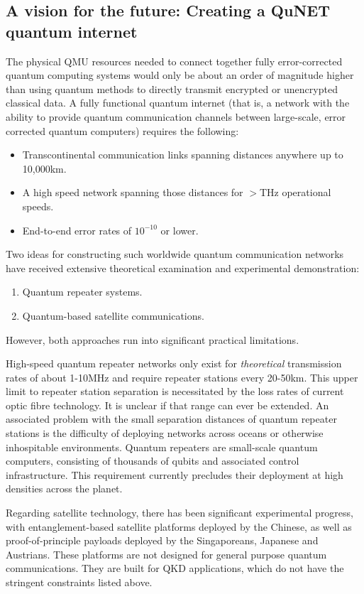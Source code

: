 \documentclass[twocolumn, aps, rmp, amsmath, amssymb, nofootinbib, superscriptaddress, longbibliography, floatfix, table-of-contents, eqsecnum]{revtex4-2}
\begin{document}
\subsection{A vision for the future: Creating a QuNET quantum internet}

The physical QMU resources needed to connect together fully error-corrected quantum computing systems would only be about an order of magnitude higher than using quantum methods to directly transmit encrypted or unencrypted classical data. A fully functional quantum internet (that is, a network with the ability to provide quantum communication channels between large-scale, error corrected quantum computers) requires the following:
\begin{itemize}
\item Transcontinental communication links spanning distances anywhere up to 10,000km.
\item A high speed network spanning those distances for $>$THz operational speeds.
\item End-to-end error rates of $10^{-10}$ or lower.
\end{itemize}

Two ideas for constructing such worldwide quantum communication networks have received extensive theoretical examination and experimental demonstration:
\begin{enumerate}
\item Quantum repeater systems.
\item Quantum-based satellite communications.
\end{enumerate}
However, both approaches run into significant practical limitations.

High-speed quantum repeater networks only exist for \textit{theoretical} transmission rates of about 1-10MHz and require repeater stations every 20-50km. This upper limit to repeater station separation is necessitated by the loss rates of current optic fibre technology. It is unclear if that range can ever be extended. An associated problem with the small separation distances of quantum repeater stations is the difficulty of deploying networks across oceans or otherwise inhospitable environments. Quantum repeaters are small-scale quantum computers, consisting of thousands of qubits and associated control infrastructure. This requirement currently precludes their deployment at high densities across the planet. 

Regarding satellite technology, there has been significant experimental progress, with entanglement-based satellite platforms deployed by the Chinese, as well as proof-of-principle payloads deployed by the Singaporeans, Japanese and Austrians. These platforms are not designed for general purpose quantum communications. They are built for QKD applications, which do not have the stringent constraints listed above. 
\end{document}
